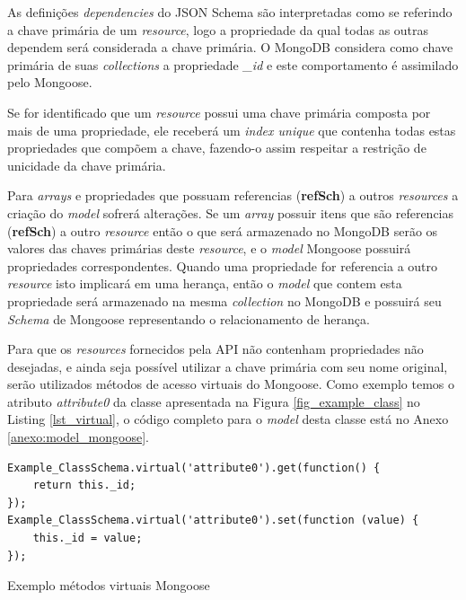 As definições \textit{dependencies} do JSON Schema são interpretadas como se referindo a chave primária de um \textit{resource}, logo a propriedade da qual todas as outras dependem será considerada a chave primária. O MongoDB considera como chave primária de suas \textit{collections} a propriedade \textit{\_id} e este comportamento é assimilado pelo Mongoose.

Se for identificado que um \textit{resource} possui uma chave primária composta por mais de uma propriedade, ele receberá um \textit{index unique} que contenha todas estas propriedades que compõem a chave, fazendo-o assim respeitar a restrição de unicidade da chave primária.

Para \textit{arrays} e propriedades que possuam referencias (\textbf{refSch}) a outros \textit{resources} a criação do \textit{model} sofrerá alterações. Se um \textit{array} possuir itens que são referencias (\textbf{refSch}) a outro \textit{resource} então o que será armazenado no MongoDB serão os valores das chaves primárias deste \textit{resource}, e o \textit{model} Mongoose possuirá propriedades correspondentes. Quando uma propriedade for referencia a outro \textit{resource} isto implicará em uma herança, então o \textit{model} que contem esta propriedade será armazenado na mesma \textit{collection} no MongoDB e possuirá seu \textit{Schema} de Mongoose representando o relacionamento de herança.

Para que os \textit{resources} fornecidos pela API não contenham propriedades não desejadas, e ainda seja possível utilizar a chave primária com seu nome original, serão utilizados métodos de acesso virtuais do Mongoose. Como exemplo temos o atributo \textit{attribute0} da classe apresentada na Figura \ref{fig_example_class} no Listing \ref{lst_virtual}, o código completo para o \textit{model} desta classe está no Anexo \ref{anexo:model_mongoose}.

\begin{listing}
\begin{verbatim}
Example_ClassSchema.virtual('attribute0').get(function() {
    return this._id;
});
Example_ClassSchema.virtual('attribute0').set(function (value) {
    this._id = value;
});
\end{verbatim}
\caption{Exemplo métodos virtuais Mongoose}
\label{lst_virtual}
\end{listing}


